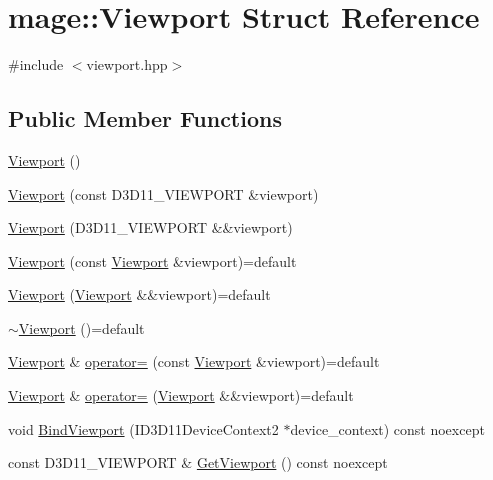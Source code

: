 \hypertarget{structmage_1_1_viewport}{}\section{mage\+:\+:Viewport Struct Reference}
\label{structmage_1_1_viewport}


{\ttfamily \#include $<$viewport.\+hpp$>$}

\subsection*{Public Member Functions}
\begin{DoxyCompactItemize}
\item 
\hyperlink{structmage_1_1_viewport_ab189482e477d46a63c514f59e09ca31b}{Viewport} ()
\item 
\hyperlink{structmage_1_1_viewport_a30e0141573acb18a4f8b1ef0aa46c8e0}{Viewport} (const D3\+D11\+\_\+\+V\+I\+E\+W\+P\+O\+RT \&viewport)
\item 
\hyperlink{structmage_1_1_viewport_a44d0f073e593ce4db5c88fad276ffbcf}{Viewport} (D3\+D11\+\_\+\+V\+I\+E\+W\+P\+O\+RT \&\&viewport)
\item 
\hyperlink{structmage_1_1_viewport_ae94d36685270b07e64730aa4eaad8d66}{Viewport} (const \hyperlink{structmage_1_1_viewport}{Viewport} \&viewport)=default
\item 
\hyperlink{structmage_1_1_viewport_a314686e3b925a4158418a98ba28c4fc6}{Viewport} (\hyperlink{structmage_1_1_viewport}{Viewport} \&\&viewport)=default
\item 
\hyperlink{structmage_1_1_viewport_a6fcf68e154b186d5c6241c495cc93fe5}{$\sim$\+Viewport} ()=default
\item 
\hyperlink{structmage_1_1_viewport}{Viewport} \& \hyperlink{structmage_1_1_viewport_ab06320c545dd9b71d17e7f8c92fb693c}{operator=} (const \hyperlink{structmage_1_1_viewport}{Viewport} \&viewport)=default
\item 
\hyperlink{structmage_1_1_viewport}{Viewport} \& \hyperlink{structmage_1_1_viewport_a83ef22f5db0991bc540372d37905524d}{operator=} (\hyperlink{structmage_1_1_viewport}{Viewport} \&\&viewport)=default
\item 
void \hyperlink{structmage_1_1_viewport_a90dc0a655ae756c85085b12c6442b8c3}{Bind\+Viewport} (I\+D3\+D11\+Device\+Context2 $\ast$device\+\_\+context) const noexcept
\item 
const D3\+D11\+\_\+\+V\+I\+E\+W\+P\+O\+RT \& \hyperlink{structmage_1_1_viewport_ad4bb75cdfbd137182898caad913de4d1}{Get\+Viewport} () const noexcept

\end{DoxyCompactItemize}
